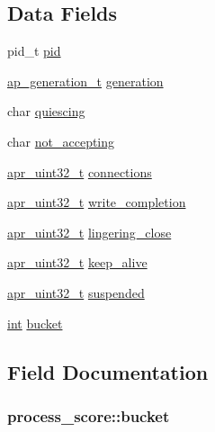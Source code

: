 \subsection*{Data Fields}
\begin{DoxyCompactItemize}
\item 
pid\+\_\+t \hyperlink{structprocess__score_a77fe9c1f37296cd514a1592800848be0}{pid}
\item 
\hyperlink{scoreboard_8h_a36af569e52dd926cc530df071af3d939}{ap\+\_\+generation\+\_\+t} \hyperlink{structprocess__score_ab1a585c99d5031aa219b77bede251bcd}{generation}
\item 
char \hyperlink{structprocess__score_ad6990194283e5d8fe862bc2becd6d99d}{quiescing}
\item 
char \hyperlink{structprocess__score_a8b4ba3926869f95003a5ae096b54ce10}{not\+\_\+accepting}
\item 
\hyperlink{group__apr__platform_ga558548a135d8a816c4787250744ea147}{apr\+\_\+uint32\+\_\+t} \hyperlink{structprocess__score_a6d605ea3abe2a3c4888c8c01a394c464}{connections}
\item 
\hyperlink{group__apr__platform_ga558548a135d8a816c4787250744ea147}{apr\+\_\+uint32\+\_\+t} \hyperlink{structprocess__score_a28b44684e2eb96db7f2a1bd739952e82}{write\+\_\+completion}
\item 
\hyperlink{group__apr__platform_ga558548a135d8a816c4787250744ea147}{apr\+\_\+uint32\+\_\+t} \hyperlink{structprocess__score_ab66fa4b7968e4814cba6825afaba4db4}{lingering\+\_\+close}
\item 
\hyperlink{group__apr__platform_ga558548a135d8a816c4787250744ea147}{apr\+\_\+uint32\+\_\+t} \hyperlink{structprocess__score_a7e182e3027e62d1ed1aa5775302ab8d0}{keep\+\_\+alive}
\item 
\hyperlink{group__apr__platform_ga558548a135d8a816c4787250744ea147}{apr\+\_\+uint32\+\_\+t} \hyperlink{structprocess__score_aba28bce0b671e908af341f1fe92c7b34}{suspended}
\item 
\hyperlink{pcre_8txt_a42dfa4ff673c82d8efe7144098fbc198}{int} \hyperlink{structprocess__score_a7601caa48450e413ce0a35c4209a92fc}{bucket}
\end{DoxyCompactItemize}


\subsection{Field Documentation}
\subsubsection[{\texorpdfstring{bucket}{bucket}}]{ process\+\_\+score\+::bucket}\hypertarget{structprocess__score_a7601caa48450e413ce0a35c4209a92fc}{}\label{structprocess__score_a7601caa48450e413ce0a35c4209a92fc}
